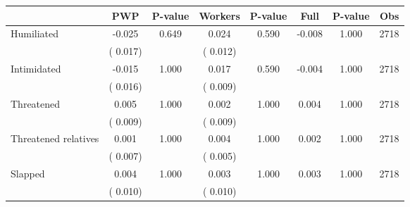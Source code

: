 
\begin{tabular}{l*{7}{c}}\hline&\multicolumn{1}{c}{PWP}&\multicolumn{1}{c}{P-value}&\multicolumn{1}{c}{Workers}&\multicolumn{1}{c}{P-value}&\multicolumn{1}{c}{Full}&\multicolumn{1}{c}{P-value}&\multicolumn{1}{c}{Obs} \\ \hline

 Humiliated       &             -0.025       &        0.649  &              0.024       &        0.590  &             -0.008       &              1.000 &  2718 \\ 
                       &       (       0.017)             &                               &       (       0.012)                     &                               &                                               &                                &                      \\ 

 Intimidated       &             -0.015       &        1.000  &              0.017       &        0.590  &             -0.004       &              1.000 &  2718 \\ 
                       &       (       0.016)             &                               &       (       0.009)                     &                               &                                               &                                &                      \\ 

 Threatened       &              0.005       &        1.000  &              0.002       &        1.000  &              0.004       &              1.000 &  2718 \\ 
                       &       (       0.009)             &                               &       (       0.009)                     &                               &                                               &                                &                      \\ 

 Threatened relatives       &              0.001       &        1.000  &              0.004       &        1.000  &              0.002       &              1.000 &  2718 \\ 
                       &       (       0.007)             &                               &       (       0.005)                     &                               &                                               &                                &                      \\ 

 Slapped       &              0.004       &        1.000  &              0.003       &        1.000  &              0.003       &              1.000 &  2718 \\ 
                       &       (       0.010)             &                               &       (       0.010)                     &                               &                                               &                                &                      \\ 


\end{tabular}
